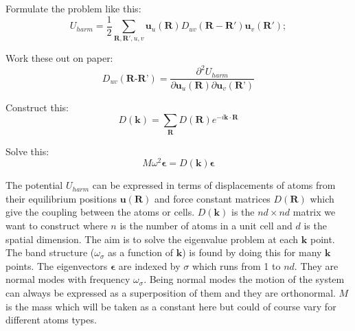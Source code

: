\documentclass[a5paper,12pt]{article}
\begin{document}
Formulate the problem like this:
\begin{equation}
U_{harm}=\frac{1}{2}\sum_ {\mathbf{R,R'},u,v}^{}\mathbf{u}_u(\mathbf{R})D_{uv}(\mathbf{R-R'})\mathbf{u}_v(\mathbf{R'}); \label{U}
\end{equation}

Work these out on paper:
\begin{equation}
D_{uv} (\textbf{R-R'})=\frac{\partial^2 U_{harm}}{\partial \textbf{u}_u(\textbf{R}) \partial \textbf{u}_v(\textbf{R'})}
\end{equation}

Construct this:
\begin{equation}
D(\mathbf{k})=\sum_{\textbf{R}} D(\mathbf{ R})e^{-i\mathbf{k} \cdot \mathbf{R}}
\end{equation}

Solve this:
\begin{equation}
M \omega^{2} \mathbf{\epsilon} = D(\mathbf{k})
\mathbf{\epsilon}
\end{equation}


\vspace{1cm}
\noindent The potential $U_{harm}$ can be expressed in terms of displacements of atoms from their equilibrium positions $\textbf{u}(\textbf{R})$ and force constant matrices $D(\mathbf{R})$ which give the coupling between the atoms or cells. \noindent $D(\mathbf{k})$ is the $nd\times nd$ matrix we want to construct where $n$ is the number of atoms in a unit cell and $d$ is the spatial dimension. The aim is to solve the eigenvalue problem at each $\mathbf{k}$ point. The band structure ($\omega_\sigma$ as a function of $\mathbf{k}$) is found by doing this for many $\mathbf{k}$ points. The eigenvectors $\mathbf{\epsilon}$ are indexed by $\sigma$ which runs from 1 to $nd$. They are normal modes with frequency $\omega_\sigma$. Being normal modes the motion of the system can always be expressed as a superposition of them and they are orthonormal. $M$ is the mass which will be taken as a constant here but could of course vary for different atoms types.
\end{document}
